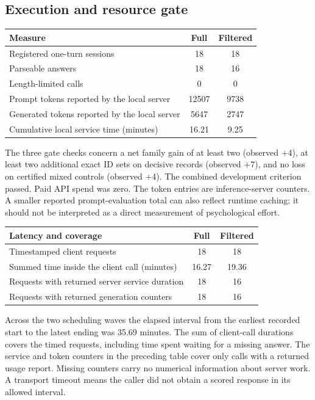 \documentclass[12pt,letterpaper]{article}
\begin{document}
\subsection{Execution and resource gate}

\begin{center}{\small\setlength{\tabcolsep}{4pt}\begin{tabularx}{\linewidth}{@{}Ycc@{}}\toprule
Measure & Full & Filtered\\ \midrule
Registered one-turn sessions & 18 & 18\\
Parseable answers & 18 & 16\\
Length-limited calls & 0 & 0\\
Prompt tokens reported by the local server & 12507 & 9738\\
Generated tokens reported by the local server & 5647 & 2747\\
Cumulative local service time (minutes) & 16.21 & 9.25\\ \bottomrule\end{tabularx}}
\end{center}

The three gate checks concern a net family gain of at least two (observed +4), at least two additional exact ID sets on decisive records (observed +7), and no loss on certified mixed controls (observed +4). The combined development criterion passed. Paid API spend was zero. The token entries are inference-server counters. A smaller reported prompt-evaluation total can also reflect runtime caching; it should not be interpreted as a direct measurement of psychological effort.

\begin{center}{\small\setlength{\tabcolsep}{4pt}\begin{tabularx}{\linewidth}{@{}Ycc@{}}\toprule
Latency and coverage & Full & Filtered\\ \midrule
Timestamped client requests & 18 & 18\\
Summed time inside the client call (minutes) & 16.27 & 19.36\\
Requests with returned server service duration & 18 & 16\\
Requests with returned generation counters & 18 & 16\\ \bottomrule\end{tabularx}}
\end{center}

Across the two scheduling waves the elapsed interval from the earliest recorded start to the latest ending was 35.69 minutes. The sum of client-call durations covers the timed requests, including time spent waiting for a missing answer. The service and token counters in the preceding table cover only calls with a returned usage report. Missing counters carry no numerical information about server work. A transport timeout means the caller did not obtain a scored response in its allowed interval.
\end{document}

